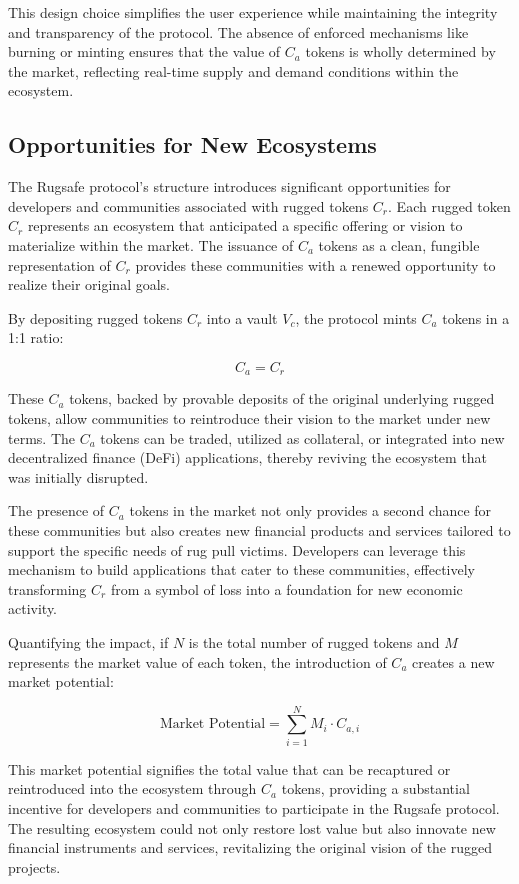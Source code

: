 \documentclass{article}
\begin{document}
This design choice simplifies the user experience while maintaining the integrity and transparency of the protocol. The absence of enforced mechanisms like burning or minting ensures that the value of $C_a$ tokens is wholly determined by the market, reflecting real-time supply and demand conditions within the ecosystem.









\subsection{Opportunities for New Ecosystems}
The Rugsafe protocol's structure introduces significant opportunities for developers and communities associated with rugged tokens $C_r$. Each rugged token $C_r$ represents an ecosystem that anticipated a specific offering or vision to materialize within the market. The issuance of $C_a$ tokens as a clean, fungible representation of $C_r$ provides these communities with a renewed opportunity to realize their original goals.

By depositing rugged tokens $C_r$ into a vault $V_c$, the protocol mints $C_a$ tokens in a 1:1 ratio:

\[
C_a = C_r
\]

These $C_a$ tokens, backed by provable deposits of the original underlying rugged tokens, allow communities to reintroduce their vision to the market under new terms. The $C_a$ tokens can be traded, utilized as collateral, or integrated into new decentralized finance (DeFi) applications, thereby reviving the ecosystem that was initially disrupted.

The presence of $C_a$ tokens in the market not only provides a second chance for these communities but also creates new financial products and services tailored to support the specific needs of rug pull victims. Developers can leverage this mechanism to build applications that cater to these communities, effectively transforming $C_r$ from a symbol of loss into a foundation for new economic activity.

Quantifying the impact, if $N$ is the total number of rugged tokens and $M$ represents the market value of each token, the introduction of $C_a$ creates a new market potential:

\[
\text{Market Potential} = \sum_{i=1}^{N} M_i \cdot C_{a,i}
\]

This market potential signifies the total value that can be recaptured or reintroduced into the ecosystem through $C_a$ tokens, providing a substantial incentive for developers and communities to participate in the Rugsafe protocol. The resulting ecosystem could not only restore lost value but also innovate new financial instruments and services, revitalizing the original vision of the rugged projects.
\end{document}
